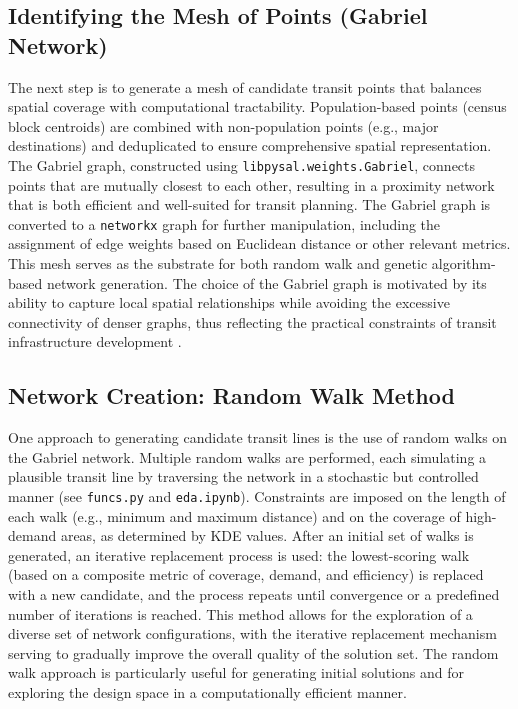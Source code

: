 \documentclass[manuscript,screen,review]{acmart}
\begin{document}
\subsection{Identifying the Mesh of Points (Gabriel Network)}
The next step is to generate a mesh of candidate transit points that balances spatial coverage with computational tractability. Population-based points (census block centroids) are combined with non-population points (e.g., major destinations) and deduplicated to ensure comprehensive spatial representation. The Gabriel graph, constructed using \texttt{libpysal.weights.Gabriel}, connects points that are mutually closest to each other, resulting in a proximity network that is both efficient and well-suited for transit planning. The Gabriel graph is converted to a \texttt{networkx} graph for further manipulation, including the assignment of edge weights based on Euclidean distance or other relevant metrics. This mesh serves as the substrate for both random walk and genetic algorithm-based network generation. The choice of the Gabriel graph is motivated by its ability to capture local spatial relationships while avoiding the excessive connectivity of denser graphs, thus reflecting the practical constraints of transit infrastructure development \cite{bib:samet1984quadtrees, bib:libera1986btrees}.

\subsection{Network Creation: Random Walk Method}
One approach to generating candidate transit lines is the use of random walks on the Gabriel network. Multiple random walks are performed, each simulating a plausible transit line by traversing the network in a stochastic but controlled manner (see \texttt{funcs.py} and \texttt{eda.ipynb}). Constraints are imposed on the length of each walk (e.g., minimum and maximum distance) and on the coverage of high-demand areas, as determined by KDE values. After an initial set of walks is generated, an iterative replacement process is used: the lowest-scoring walk (based on a composite metric of coverage, demand, and efficiency) is replaced with a new candidate, and the process repeats until convergence or a predefined number of iterations is reached. This method allows for the exploration of a diverse set of network configurations, with the iterative replacement mechanism serving to gradually improve the overall quality of the solution set. The random walk approach is particularly useful for generating initial solutions and for exploring the design space in a computationally efficient manner.
\end{document}
